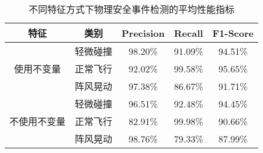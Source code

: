 \begin{table}[ht]
\caption{不同特征方式下物理安全事件检测的平均性能指标}
\label{tab:cross_cnn}
\centering
\begin{tabular}{c|c|ccc}
        \toprule[1.5pt]
        {特征} & {类别}  & {Precision} & {Recall} & {F1-Score}  \\
        \midrule[0.8pt]
        \multirow{3}{*}{使用不变量} & 轻微碰撞 & 98.20\% &   91.09\%  &  94.51\% \\
        
        & 正常飞行  & 92.02\%  &  99.58\%   & 95.65\% \\
        
        & 阵风晃动  & 97.38\%  &  86.67\% &   91.71\% \\
        \midrule[0.8pt]
        \multirow{3}{*}{不使用不变量} & 轻微碰撞 & 96.51\% &   92.48\%  &  94.45\% \\
        
        & 正常飞行  & 82.91\%  &  99.98\%   & 90.66\% \\
        
        & 阵风晃动  & 98.76\%  &  79.33\% &   87.99\% \\
        \bottomrule[1.5pt]
\end{tabular}
\end{table}